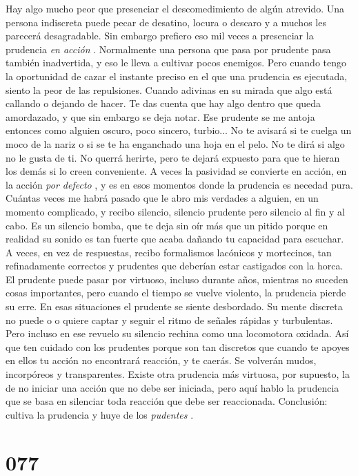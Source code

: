 \documentclass[a4paper,11pt,openright,twocolumn]{book}
\begin{document}
Hay algo mucho peor que presenciar el descomedimiento de algún atrevido. Una persona indiscreta puede
pecar de desatino, locura o descaro y a muchos les parecerá desagradable. Sin embargo prefiero eso mil
veces a presenciar la prudencia {\it en acción}  . Normalmente una persona que pasa por prudente
pasa también inadvertida, y eso le lleva a cultivar pocos enemigos. Pero cuando tengo la oportunidad
de cazar el instante preciso en el que una prudencia es ejecutada, siento la peor de las
repulsiones. Cuando adivinas en su mirada que algo está callando o dejando de hacer. Te das cuenta
que hay algo dentro que queda amordazado, y que sin embargo se deja notar. Ese prudente se me antoja
entonces como alguien oscuro, poco sincero, turbio... No te avisará si te cuelga un moco de la nariz 
o si se te ha enganchado una hoja en el pelo. No te dirá si algo no le gusta de ti. No querrá herirte,
pero te dejará expuesto para que te hieran los demás si lo creen conveniente.
A veces la pasividad se convierte en acción,
en la acción {\it por defecto}  , y es en esos momentos donde la prudencia es necedad pura. Cuántas veces
me habrá pasado que le abro mis verdades a alguien, en un momento complicado, y recibo silencio, silencio
prudente pero silencio al fin y al cabo. Es un silencio bomba, que te deja sin oír más que un pitido
porque en realidad su sonido es tan fuerte que acaba dañando tu capacidad para escuchar. A veces,
en vez de respuestas, recibo formalismos lacónicos y mortecinos, tan refinadamente correctos y prudentes que
deberían estar castigados con la horca. El prudente puede pasar por virtuoso, incluso durante años,
mientras no suceden cosas importantes, pero cuando el tiempo se vuelve violento, la prudencia
pierde su erre. En esas situaciones el prudente se siente desbordado.
Su mente discreta no puede o o quiere captar
y seguir el ritmo de señales rápidas y turbulentas. Pero incluso en ese revuelo su silencio
rechina como una locomotora oxidada. Así que ten cuidado con los prudentes porque son tan discretos
que cuando te apoyes en ellos tu acción no encontrará reacción, y te caerás. Se volverán
mudos, incorpóreos y transparentes. Existe otra prudencia más virtuosa, por supuesto, la de no iniciar
una acción que no debe ser iniciada, pero aquí hablo la prudencia que se basa en silenciar toda reacción
que debe ser reaccionada. Conclusión: cultiva la prudencia y huye de los {\it pudentes}  .


\section*{077}
\end{document}
